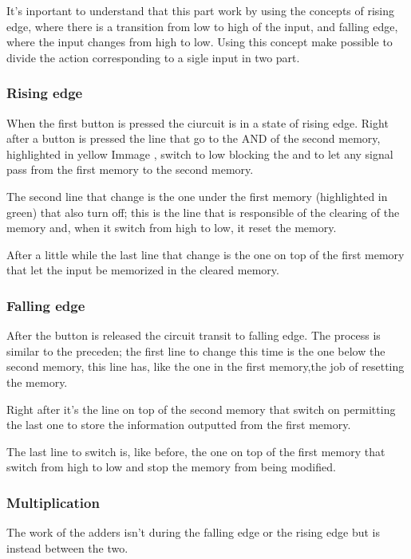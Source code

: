 \documentclass{article}
\begin{document}
It's inportant to understand that this part work by using the concepts of rising edge, where there is a transition from low to high of the input, and falling edge, where the input changes from high to low. Using this concept make possible to divide the action corresponding to a sigle input in two part.



\subsubsection{Rising edge}

When the first button is pressed the ciurcuit is in a state of rising edge. 
Right after a button is pressed the line that go to the AND of the second memory, highlighted in yellow Immage %
, switch to low blocking the and to let any signal pass from the first memory to the second memory.

The second line that change is the one under the first memory (highlighted in green) that also turn off; this is the line that is responsible of the clearing of the memory and, when it switch from high to low, it reset the memory.

After a little while the last line that change is the one on top of the first memory that let the input be memorized in the cleared memory.


\subsubsection{Falling edge}

After the button is released the circuit transit to falling edge.
The process is similar to the preceden; the first line to change this time is the one below the second memory, this line has, like the one in the first memory,the job of resetting the memory.

Right after it's the line on top of the second memory that switch on permitting the last one to store the information outputted from the first memory.

The last line to switch is, like before, the one on top of the first memory that switch from high to low and stop the memory from being modified.


\subsubsection{Multiplication}

The work of the adders isn't during the falling edge or the rising edge but is instead  between the two.
\end{document}
